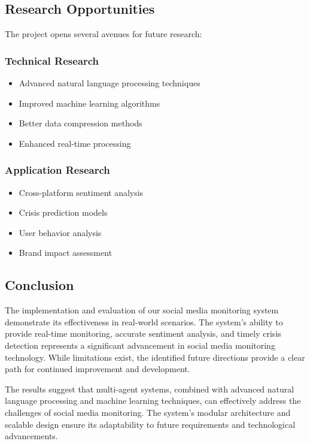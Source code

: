 \subsection{Research Opportunities}
The project opens several avenues for future research:

\subsubsection{Technical Research}
\begin{itemize}
    \item Advanced natural language processing techniques
    \item Improved machine learning algorithms
    \item Better data compression methods
    \item Enhanced real-time processing
\end{itemize}

\subsubsection{Application Research}
\begin{itemize}
    \item Cross-platform sentiment analysis
    \item Crisis prediction models
    \item User behavior analysis
    \item Brand impact assessment
\end{itemize}

\subsection{Conclusion}
The implementation and evaluation of our social media monitoring system demonstrate its effectiveness in real-world scenarios. The system's ability to provide real-time monitoring, accurate sentiment analysis, and timely crisis detection represents a significant advancement in social media monitoring technology. While limitations exist, the identified future directions provide a clear path for continued improvement and development.

The results suggest that multi-agent systems, combined with advanced natural language processing and machine learning techniques, can effectively address the challenges of social media monitoring. The system's modular architecture and scalable design ensure its adaptability to future requirements and technological advancements. 
